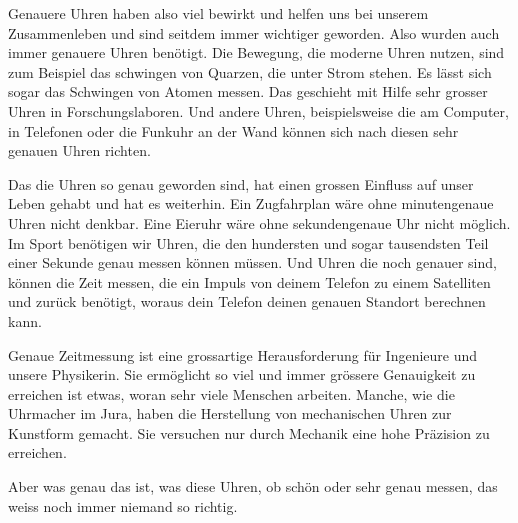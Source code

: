 Genauere Uhren haben also viel bewirkt und helfen uns bei unserem Zusammenleben
und sind seitdem immer wichtiger geworden. Also wurden auch immer genauere
Uhren benötigt. Die Bewegung, die moderne Uhren nutzen, sind zum Beispiel das
schwingen von Quarzen, die unter Strom stehen. Es lässt sich sogar das
Schwingen von Atomen messen. Das geschieht mit Hilfe sehr grosser Uhren in
Forschungslaboren. Und andere Uhren, beispielsweise die am Computer, in
Telefonen oder die Funkuhr an der Wand können sich nach diesen sehr genauen
Uhren richten. 

Das die Uhren so genau geworden sind, hat einen grossen Einfluss auf unser
Leben gehabt und hat es weiterhin. Ein Zugfahrplan wäre ohne minutengenaue
Uhren nicht denkbar. Eine Eieruhr wäre ohne sekundengenaue Uhr nicht möglich.
Im Sport benötigen wir Uhren, die den hundersten und sogar tausendsten Teil
einer Sekunde genau messen können müssen. Und Uhren die noch genauer sind,
können die Zeit messen, die ein Impuls von deinem Telefon zu einem Satelliten
und zurück benötigt, woraus dein Telefon deinen genauen Standort berechnen
kann. 

Genaue Zeitmessung ist eine grossartige Herausforderung für Ingenieure und
unsere Physikerin. Sie ermöglicht so viel und immer grössere Genauigkeit zu
erreichen ist etwas, woran sehr viele Menschen arbeiten. Manche, wie die
Uhrmacher im Jura, haben die Herstellung von mechanischen Uhren zur Kunstform
gemacht. Sie versuchen nur durch Mechanik eine hohe Präzision zu erreichen. 

Aber was genau das ist, was diese Uhren, ob schön oder sehr genau messen, das
weiss noch immer niemand so richtig.


